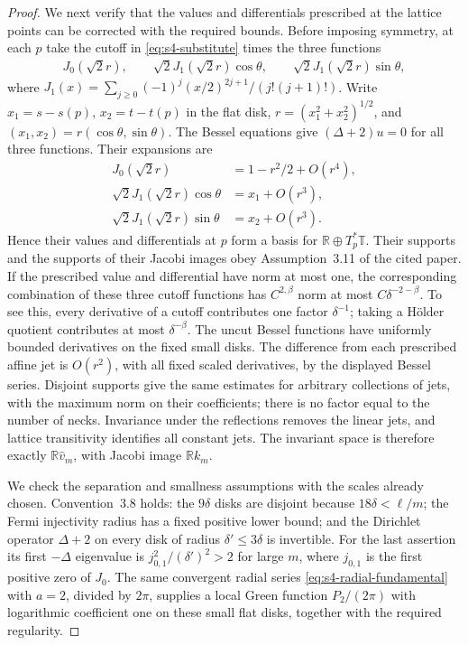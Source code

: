 \documentclass[a4paper,11pt,oneside,reqno]{amsart}
\numberwithin{equation}{section}
\theoremstyle{definition}
\begin{document}
\begin{proof}
    We next verify that the values and differentials prescribed
    at the lattice points can be corrected with the required bounds.
    Before imposing symmetry, at each $p$ take the cutoff in
    \eqref{eq:s4-substitute} times the three functions
    \begin{align*}
        J_0(\sqrt2r),\qquad
        \sqrt2J_1(\sqrt2r)\cos\theta,\qquad
        \sqrt2J_1(\sqrt2r)\sin\theta,
    \end{align*}
    where
    $J_1(x)=\sum_{j\geq0}(-1)^j(x/2)^{2j+1}/(j!(j+1)!)$.
    Write $x_1=s-s(p)$, $x_2=t-t(p)$ in the flat disk,
    $r=(x_1^2+x_2^2)^{1/2}$, and
    $(x_1,x_2)=r(\cos\theta,\sin\theta)$.
    The Bessel equations give $(\Delta+2)u=0$ for all
    three functions. Their expansions are
    \begin{align*}
        J_0(\sqrt2r)&=1-r^2/2+O(r^4),\\
        \sqrt2J_1(\sqrt2r)\cos\theta
           &=x_1+O(r^3),\\
        \sqrt2J_1(\sqrt2r)\sin\theta
           &=x_2+O(r^3).
    \end{align*}
    Hence their values and differentials at $p$ form a basis
    for $\mathbb R\oplus T_p^*\mathbb T$.
    Their supports and the supports of their Jacobi images obey
    Assumption~3.11 of the cited paper.
    If the prescribed value and differential have norm at
    most one, the corresponding combination of these three
    cutoff functions has $C^{2,\beta}$ norm at most
    $C\delta^{-2-\beta}$. To see this, every derivative of
    a cutoff contributes one factor $\delta^{-1}$;
    taking a H\"older quotient contributes at most
    $\delta^{-\beta}$. The uncut Bessel functions have
    uniformly bounded derivatives on the fixed small disks.
    The difference from each prescribed affine jet is $O(r^2)$,
    with all fixed scaled derivatives, by the displayed Bessel
    series. Disjoint supports give the same estimates for arbitrary
    collections of jets, with the maximum norm on their
    coefficients; there is no factor equal to the number of necks.
    Invariance under the reflections removes the linear jets, and
    lattice transitivity identifies all constant jets. The invariant
    space is therefore exactly $\mathbb{R}\widehat v_m$, with
    Jacobi image $\mathbb{R} k_m$.

    We check the separation and smallness assumptions with
    the scales already chosen.
    Convention~3.8 holds: the $9\delta$ disks are disjoint because
    $18\delta<\ell/m$; the Fermi injectivity radius has a fixed
    positive lower bound; and the Dirichlet operator $\Delta+2$
    on every disk of radius $\delta'\leq3\delta$ is invertible.
    For the last assertion its first $-\Delta$ eigenvalue is
    $j_{0,1}^2/(\delta')^2>2$ for large $m$, where $j_{0,1}$
    is the first positive zero of $J_0$. The same convergent
    radial series \eqref{eq:s4-radial-fundamental} with $a=2$,
    divided by $2\pi$, supplies a local Green function
    $P_2/(2\pi)$ with logarithmic coefficient one on these small
    flat disks, together with the required regularity.


\end{proof}
\end{document}
